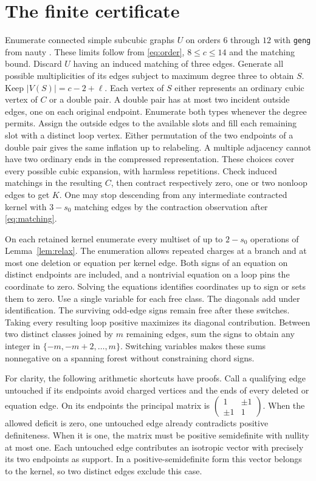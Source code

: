 \documentclass[11pt]{article}
\begin{document}
\section{The finite certificate}
Enumerate connected simple subcubic graphs $U$ on orders $6$ through $12$ with \texttt{geng} from nauty \cite{nauty}. These limits follow from \eqref{eq:order}, $8\le c\le14$ and the matching bound. Discard $U$ having an induced matching of three edges. Generate all possible multiplicities of its edges subject to maximum degree three to obtain $S$. Keep $|V(S)|=c-2+\ell$. Each vertex of $S$ either represents an ordinary cubic vertex of $C$ or a double pair. A double pair has at most two incident outside edges, one on each original endpoint. Enumerate both types whenever the degree permits. Assign the outside edges to the available slots and fill each remaining slot with a distinct loop vertex. Either permutation of the two endpoints of a double pair gives the same inflation up to relabeling. A multiple adjacency cannot have two ordinary ends in the compressed representation. These choices cover every possible cubic expansion, with harmless repetitions. Check induced matchings in the resulting $C$, then contract respectively zero, one or two nonloop edges to get $K$. One may stop descending from any intermediate contracted kernel with $3-s_0$ matching edges by the contraction observation after \eqref{eq:matching}.

On each retained kernel enumerate every multiset of up to $2-s_0$ operations of Lemma~\ref{lem:relax}. The enumeration allows repeated charges at a branch and at most one deletion or equation per kernel edge. Both signs of an equation on distinct endpoints are included, and a nontrivial equation on a loop pins the coordinate to zero. Solving the equations identifies coordinates up to sign or sets them to zero. Use a single variable for each free class. The diagonals add under identification. The surviving odd-edge signs remain free after these switches. Taking every resulting loop positive maximizes its diagonal contribution. Between two distinct classes joined by $m$ remaining edges, sum the signs to obtain any integer in $\{-m,-m+2,\ldots,m\}$. Switching variables makes these sums nonnegative on a spanning forest without constraining chord signs.

For clarity, the following arithmetic shortcuts have proofs. Call a qualifying edge untouched if its endpoints avoid charged vertices and the ends of every deleted or equation edge. On its endpoints the principal matrix is $\left(\begin{smallmatrix}1&\pm1\\\pm1&1\end{smallmatrix}\right)$. When the allowed deficit is zero, one untouched edge already contradicts positive definiteness. When it is one, the matrix must be positive semidefinite with nullity at most one. Each untouched edge contributes an isotropic vector with precisely its two endpoints as support. In a positive-semidefinite form this vector belongs to the kernel, so two distinct edges exclude this case.
\end{document}
